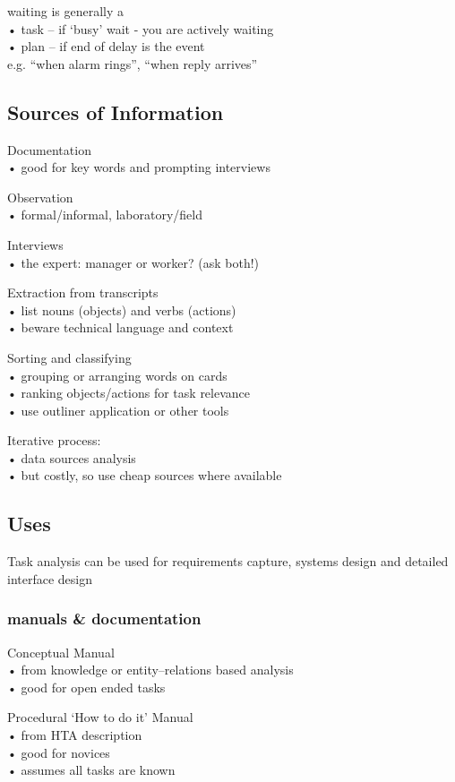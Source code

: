 \documentclass[]{project_plan}
\begin{document}
waiting is generally a\\
• task – if ‘busy’ wait - you are actively waiting\\
• plan – if end of delay is the event\\
e.g. “when alarm rings”, “when reply arrives”

\subsection{Sources of Information}
Documentation\\
• good for key words and prompting interviews

Observation\\
• formal/informal, laboratory/field

Interviews\\
• the expert: manager or worker? (ask both!)

Extraction from transcripts\\
• list nouns (objects) and verbs (actions)\\
• beware technical language and context

Sorting and classifying\\
• grouping or arranging words on cards\\
• ranking objects/actions for task relevance\\
• use outliner application or other tools

Iterative process:\\
• data sources analysis\\
• but costly, so use cheap sources where available

\subsection{Uses}
Task analysis can be used for requirements capture, systems design and detailed interface design

\subsubsection{manuals \& documentation}
Conceptual Manual\\
• from knowledge or entity–relations based analysis\\
• good for open ended tasks

Procedural ‘How to do it’ Manual\\
• from HTA description\\
• good for novices\\
• assumes all tasks are known
\end{document}
